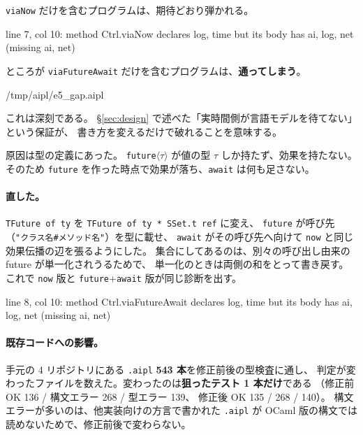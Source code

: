 \documentclass[11pt,a4paper]{ltjsarticle}
\theoremstyle{definition}
\theoremstyle{remark}
\begin{document}
\texttt{viaNow} だけを含むプログラムは、期待どおり弾かれる。

\begin{term}
 line 7, col 10: method Ctrl.viaNow declares {log, time}
             but its body has {ai, log, net} (missing {ai, net})
\end{term}

ところが \texttt{viaFutureAwait} だけを含むプログラムは、\textbf{通ってしまう}。

\begin{term}
[Loaded] /tmp/aipl/e5_gap.aipl
\end{term}

これは深刻である。
\S\ref{sec:design} で述べた「実時間側が言語モデルを待てない」という保証が、
書き方を変えるだけで破れることを意味する。

原因は型の定義にあった。
\texttt{future}$\langle\tau\rangle$ が値の型 $\tau$ しか持たず、効果を持たない。
そのため \texttt{future} を作った時点で効果が落ち、\texttt{await} は何も足さない。

\paragraph{直した。}
\texttt{TFuture of ty} を \texttt{TFuture of ty * SSet.t ref} に変え、
\texttt{future} が呼び先（\texttt{"クラス名\#メソッド名"}）を型に載せ、
\texttt{await} がその呼び先へ向けて \texttt{now} と同じ効果伝播の辺を張るようにした。
集合にしてあるのは、別々の呼び出し由来の future が単一化されうるためで、
単一化のときは両側の和をとって書き戻す。
これで \texttt{now} 版と \texttt{future}+\texttt{await} 版が同じ診断を出す。

\begin{term}
 line 8, col 10: method Ctrl.viaFutureAwait declares {log, time}
             but its body has {ai, log, net} (missing {ai, net})
\end{term}

\paragraph{既存コードへの影響。}
手元の 4 リポジトリにある \texttt{.aipl} \textbf{543 本}を修正前後の型検査に通し、
判定が変わったファイルを数えた。変わったのは\textbf{狙ったテスト 1 本だけ}である
（修正前 OK 136 / 構文エラー 268 / 型エラー 139、
修正後 OK 135 / 268 / 140）。
構文エラーが多いのは、他実装向けの方言で書かれた \texttt{.aipl} が
OCaml 版の構文では読めないためで、修正前後で変わらない。
\end{document}
